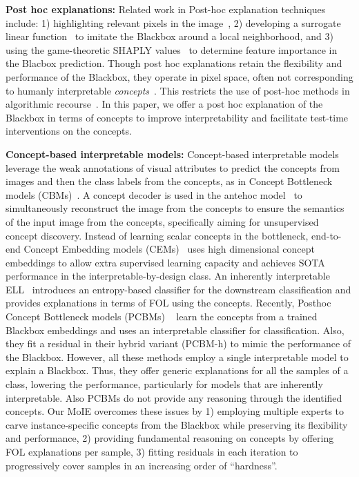 

\textbf{Post hoc explanations:} 
Related work in Post-hoc explanation techniques include: 1) highlighting relevant pixels in the image~\cite{simonyan2013deep, selvaraju2017grad, smilkov2017smoothgrad, sundararajan2017axiomatic, binder2016layer}, 2) developing a surrogate linear function~\cite{ribeiro2016should, yoon2019rl} to imitate the Blackbox around a local neighborhood, and 3) using the game-theoretic SHAPLY values~\cite{SHAP} to determine feature importance in the Blacbox prediction. Though post hoc explanations retain the flexibility and performance of the Blackbox, they operate in pixel space, often not corresponding to humanly interpretable \emph{concepts}~\cite{kim2017interpretability}. This restricts the use of post-hoc methods in algorithmic recourse~\cite{bordt2022post}. In this paper, we offer a post hoc explanation of the Blackbox in terms of concepts to improve interpretability and facilitate test-time interventions on the concepts.

\textbf{Concept-based interpretable models:}
Concept-based interpretable models leverage the weak annotations of visual attributes to predict the concepts from images and then the class labels from the concepts, as in Concept Bottleneck models (CBMs)~\cite{koh2020concept}. A concept decoder is used in the antehoc model~\cite{sarkar2021inducing} to simultaneously reconstruct the image from the concepts to ensure the semantics of the input image from the concepts, specifically aiming for unsupervised concept discovery. Instead of learning scalar concepts in the bottleneck, end-to-end Concept Embedding models (CEMs)~\cite{zarlenga2022concept} uses high dimensional concept embeddings to allow extra supervised learning capacity and achieves SOTA performance in the interpretable-by-design class. An inherently interpretable ELL~\cite{barbiero2022entropy} introduces an entropy-based classifier for the downstream classification and provides explanations in terms of FOL using the concepts. Recently, Posthoc Concept Bottleneck models (PCBMs) ~\cite{yuksekgonul2022post} learn the concepts from a trained Blackbox  embeddings and uses an interpretable classifier for classification. Also, they fit a residual in their hybrid variant (PCBM-h) to mimic the performance of the Blackbox. However, all these methods employ a single interpretable model to explain a Blackbox. Thus, they offer generic explanations for all the samples of a class, lowering the performance, particularly for models that are inherently interpretable. Also PCBMs do not provide any reasoning through the identified concepts. Our MoIE overcomes these issues by 1) employing multiple experts to carve instance-specific concepts from the Blackbox while preserving its flexibility and performance, 2) providing fundamental reasoning on concepts by offering FOL explanations per sample, 3) fitting residuals in each iteration to progressively cover samples in an increasing order of ``hardness''.

